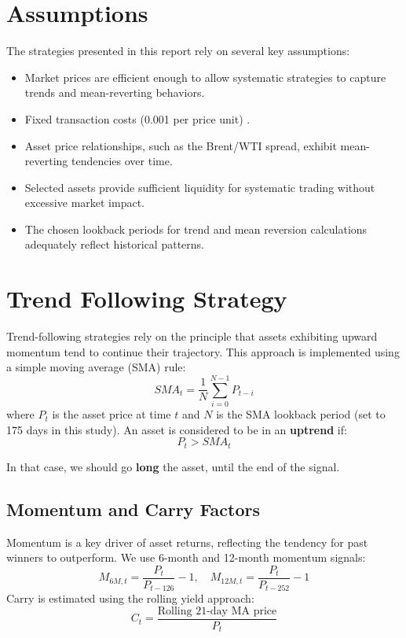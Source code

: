 \documentclass[11pt, oneside, a4paper, titlepage]{report}
\begin{document}
\section{Assumptions}
The strategies presented in this report rely on several key assumptions:
\begin{itemize}
    \item Market prices are efficient enough to allow systematic strategies to capture trends and mean-reverting behaviors.
    \item Fixed transaction costs (0.001 per price unit) .
    \item Asset price relationships, such as the Brent/WTI spread, exhibit mean-reverting tendencies over time.
    \item Selected assets provide sufficient liquidity for systematic trading without excessive market impact.
    \item The chosen lookback periods for trend and mean reversion calculations adequately reflect historical patterns.
\end{itemize}


\section{Trend Following Strategy}
Trend-following strategies rely on the principle that assets exhibiting upward momentum tend to continue their trajectory. This approach is implemented using a simple moving average (SMA) rule:
\begin{equation}
    SMA_t = \frac{1}{N} \sum_{i=0}^{N-1} P_{t-i}
\end{equation}
where $P_t$ is the asset price at time $t$ and $N$ is the SMA lookback period (set to 175 days in this study). An asset is considered to be in an \textbf{uptrend} if:
\begin{equation}
    P_t > SMA_t
\end{equation}

In that case, we should go \textbf{long} the asset, until the end of the signal.

\subsection{Momentum and Carry Factors}
Momentum is a key driver of asset returns, reflecting the tendency for past winners to outperform. We use 6-month and 12-month momentum signals:
\begin{equation}
    M_{6M,t} = \frac{P_t}{P_{t-126}} - 1, \quad M_{12M,t} = \frac{P_t}{P_{t-252}} - 1
\end{equation}
Carry is estimated using the rolling yield approach:
\begin{equation}
    C_t = \frac{\text{Rolling 21-day MA price}}{P_t}
\end{equation}
\end{document}
